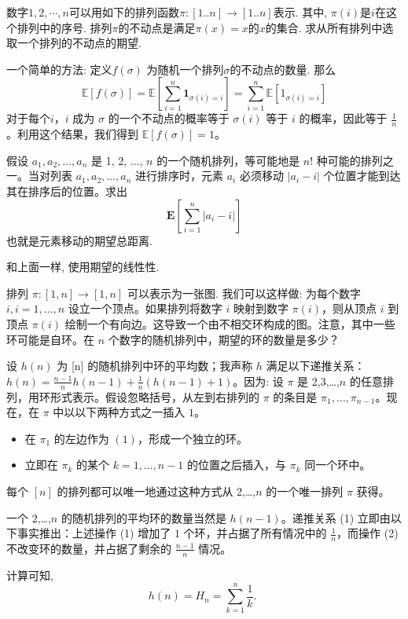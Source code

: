 \begin{exercise}
     数字$1,2,\cdots, n$可以用如下的排列函数$\pi:[1..n] \to [1..n]$表示. 其中, $\pi(i)$是$i$在这个排列中的序号. 排列$\pi$的不动点是满足$\pi(x)=x$的$x$的集合. 求从所有排列中选取一个排列的不动点的期望. 
\end{exercise}

\begin{solution*}
    一个简单的方法: 定义$f(\sigma)$ 为随机一个排列$\sigma$的不动点的数量. 
    那么$$
    \mathbb{E}[{f}(\sigma)]=\mathbb{E}\left[\sum_{{i}=1}^{{n}} \mathbf{1}_{\sigma({i})={i}}\right]=\sum_{{i}=1}^{{n}} \mathbb{E}\left[1_{\sigma({i})={i}}\right]
    $$
    对于每个$i$，$i$ 成为 $\sigma$ 的一个不动点的概率等于 $\sigma(i)$ 等于 $i$ 的概率，因此等于 $\frac{1}{n}$。利用这个结果，我们得到 $\mathbb{E}[f(\sigma)]=1$。
\end{solution*}

\begin{exercise}
    假设 $a_1, a_2, \dots, a_n$ 是 {1, 2, $\dots$, $n$} 的一个随机排列，等可能地是 $n!$ 种可能的排列之一。当对列表 $a_1, a_2, \dots, a_n$ 进行排序时，元素 $a_i$ 必须移动 $|a_i - i|$ 个位置才能到达其在排序后的位置。求出$$
    \mathbf{E}\left[\sum_{i=1}^n\left|a_i-i\right|\right]
    $$
    也就是元素移动的期望总距离. 
\end{exercise}

\begin{solution*}
    和上面一样, 使用期望的线性性. 
\end{solution*}

\begin{exercise}
    排列 $\pi: [1, n] \rightarrow [1, n]$ 可以表示为一张图. 我们可以这样做: 为每个数字 $i, i = 1, \dots, n$ 设立一个顶点。如果排列将数字 $i$ 映射到数字 $\pi(i)$，则从顶点 $i$ 到顶点 $\pi(i)$ 绘制一个有向边。这导致一个由不相交环构成的图。注意，其中一些环可能是自环。在 $n$ 个数字的随机排列中，期望的环的数量是多少？
\end{exercise}

\begin{solution*}
    设 $h(n)$ 为 [n] 的随机排列中环的平均数；我声称 $h$ 满足以下递推关系：$h(n)=\frac{n-1}{n}h(n-1)+\frac{1}{n}(h(n-1)+1)$。因为:
    设 $\pi$ 是 {2,3,…,$n$} 的任意排列，用环形式表示。假设忽略括号，从左到右排列的 $\pi$ 的条目是 $\pi_1,\dots,\pi_{n-1}$。现在，在 $\pi$ 中以以下两种方式之一插入 $1$。
    \begin{itemize}
        \item 在 $\pi_1$ 的左边作为 $(1)$，形成一个独立的环。
        \item 立即在 $\pi_k$ 的某个 $k=1,\dots,n-1$ 的位置之后插入，与 $\pi_k$ 同一个环中。
    \end{itemize}
    每个 $[n]$ 的排列都可以唯一地通过这种方式从 {2,…,$n$} 的一个唯一排列 $\pi$ 获得。

一个 {2,…,$n$} 的随机排列的平均环的数量当然是 $h(n-1)$。递推关系 (1) 立即由以下事实推出：上述操作 (1) 增加了 $1$ 个环，并占据了所有情况中的 $\frac{1}{n}$，而操作 (2) 不改变环的数量，并占据了剩余的 $\frac{n-1}{n}$ 情况。

计算可知, 
$$
h(n)=H_n=\sum_{k=1}^n \frac{1}{k} \text {. }
$$
\end{solution*}